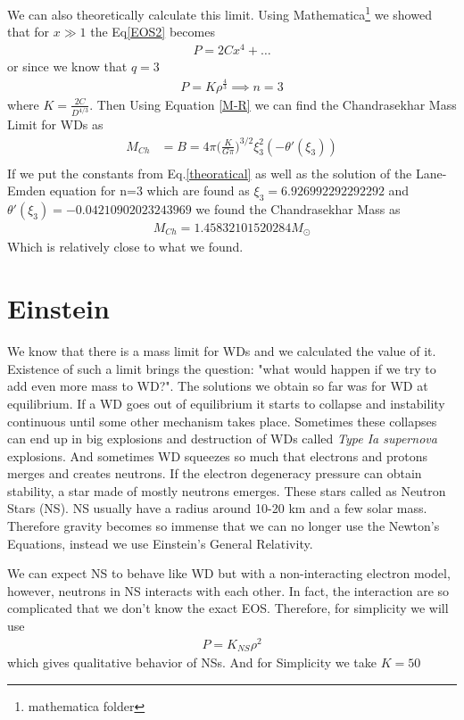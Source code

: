 \documentclass[aps,twocolumn,showpacs,preprintnumbers,nofootinbib,prl,superscriptaddress,groupedaddress]{revtex4-1}
\begin{document}
We can also theoretically calculate this limit. Using Mathematica\footnote{mathematica folder} we showed that for $x \gg 1$ the Eq\ref{EOS2} becomes
\begin{align}
	P = 2Cx^4 + \dots
\end{align}
or since we know that $q = 3$
\begin{align}
	P = K\rho^{\frac{4}{3}} \implies n = 3
\end{align}
where $K = \frac{2C}{D^{4/3}}$. Then Using Equation \ref{M-R} we can find the Chandrasekhar Mass Limit for WDs as
\begin{align}
	M_{Ch} &= B = 4\pi\bigg(\frac{K}{G\pi}\bigg)^{3/2}\xi_3^2 (-\theta'(\xi_3))\\
\end{align}
If we put the constants from Eq.\ref{theoratical} as well as the solution of the Lane-Emden equation for n=3 which are found as $\xi_3 = 6.926992292292292$ and $\theta'(\xi_3) = -0.04210902023243969$ we found the Chandrasekhar Mass as
\begin{align}
	M_{Ch} = 1.45832101520284 M_\odot
\end{align}
Which is relatively close to what we found.

\section{Einstein}
We know that there is a mass limit for WDs and we calculated the value of it. Existence of such a limit brings the question: "what would happen if we try to add even more mass to WD?". The solutions we obtain so far was for WD at equilibrium. If a WD goes out of equilibrium it starts to collapse and instability continuous  until some other mechanism takes place. Sometimes these collapses can end up in big explosions and destruction of WDs called \textit{Type Ia supernova} explosions. And sometimes WD squeezes so much that electrons and protons merges and creates neutrons. If the electron degeneracy pressure can obtain stability, a star made of mostly neutrons  emerges. These stars called as Neutron Stars (NS). NS usually have a radius around 10-20 km and a few solar mass. Therefore gravity becomes so immense that we can no longer use the Newton's Equations, instead we use Einstein's General Relativity.

We can expect NS to behave like WD but with a non-interacting electron model, however, neutrons in NS interacts with each other. In fact, the interaction are so complicated that we don't know the exact EOS. Therefore, for simplicity we will use 
\begin{align}\label{EOS NS}
	P = K_{NS}\rho^2
\end{align}
which gives qualitative behavior of NSs. And for Simplicity we take $ K =50 $
\end{document}
